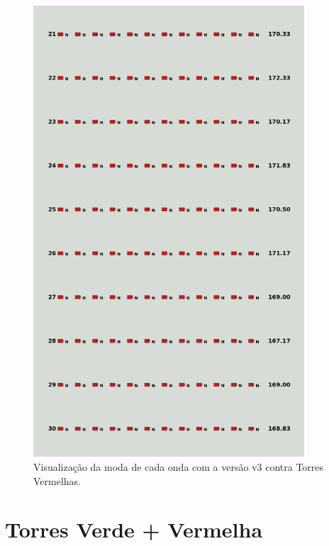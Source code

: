 \begin{figure}[H]
  \centering
  \includegraphics[width=0.9\textwidth]{figuras/td/td_allred_ai_mode_3_3.png}
  \caption{Visualização da moda de cada onda com a versão v3 contra Torres Vermelhas.}
  \label{fig:td-moda-red-3-3}
\end{figure}

\section{Torres Verde + Vermelha}
\label{sec:apend-moda-td-gr-v3}

